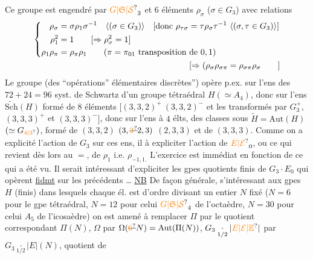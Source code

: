 Ce groupe est engendré par ${\unsure{G|\mathfrak S|\mathcal S}}_3$ et $6$ éléments $\rho_\sigma$ ($\sigma\in G_3$) \deleted{$\rho_\sigma=\sigma$} avec relations
\[
\begin{aligned}
\left\{\begin{aligned}
\rho_\sigma&=\sigma\rho_1\sigma^{-1}\quad\inserted{(\sigma\in G_3)}
  \quad[\text{donc }\rho_{\tau\sigma}=\tau\rho_\sigma\tau^{-1}\ \inserted{(\sigma,\tau\in G_3)}]\\
\rho_1^2&=1\qquad [\Rightarrow \rho_\sigma^2=1]\\
\rho_1\rho_\pi&=\rho_\pi\rho_1\qquad(\pi=\pi_{01}\ \text{transposition de }0,1)
\end{aligned}\right.\\
[\Rightarrow(\rho_\sigma\rho_{\sigma\pi}=\rho_{\sigma\pi}\rho_\sigma\qquad]
\end{aligned}
\]
Le groupe  (des ``opérations'' élémentaires discrètes'') opère p.ex. sur l'ens des $72+24=96$ syst. de Schwartz  d'un groupe tétraédral $H(\simeq A_4)$, donc sur l'ens $\widetilde{\mathrm{Sch}}(H)$ formé de $8$ éléments $[(3,3,2)^+\ (3,3,2)^-$ et les transformés par $G_3^+$, $(3,3,3)^+$ et $(3,3,3)^-]$, donc sur l'ens à $4$ élts, des classes sous  $\widetilde H=\mathrm{Aut}(H)$ $(\simeq G_{\unsure{4|3}})$, formé de $(3,3,2)$ $(3,\deleted{\unsure{3}}2,3)$ $(2,3,3)$ et de $(3,3,3)$. Comme on a explicité l'action de $G_3$ sur ces ens, il  à expliciter l'action de $\unsure{E|\mathcal E}_0$, ou ce qui revient dès lors au $=$, de $\rho_1$ i.e. $\rho_{-1,1.}$ L'exercice est immédiat en fonction de ce qui a été vu.  Il serait intéressant d'expliciter les gpes quotients finis de $G_3\cdot E_0$ qui opèrent \uline{fidmt} sur les  précédents \ldots
\uline{NB} De façon générale, s'intéressant aux gpes $H$ (finis) dans lesquels chaque él. est d'ordre  divisant un entier $N$ fixé ($N=6$ pour le gpe tétraédral, $N=12$ pour celui ${\unsure{G|\mathfrak S|\mathcal S}}_4$ de l'octaèdre, $N=30$ pour celui $A_5$ de l'icosaèdre) on est amené à remplacer $\Pi$ par le quotient correspondant $\Pi(N)$, $\Omega$ par $\Omega(\deleted{\unsure{6}}N)=\mathrm{Aut}(\Pi(N))$,  $G_3\underset{1/2}{\cdot}|\unsure{E|\mathcal E|\mathbb E}|$ par $G_3\underset{1/2}{\cdot}|E|(N)$, quotient de 
